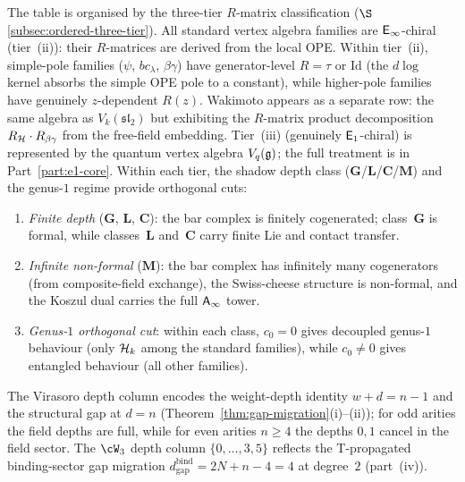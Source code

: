 \begin{computation}
The table is organised by the three-tier $R$-matrix
classification
($\S$\ref{subsec:ordered-three-tier}).
All standard vertex algebra families are $\mathsf{E}_{\infty}$-chiral
(tier~(ii)): their $R$-matrices are derived from the
local OPE\@. Within tier~(ii), simple-pole families
($\psi$, $bc_\lambda$, $\beta\gamma$) have
generator-level $R = \tau$ or $\mathrm{Id}$
(the $d\log$ kernel absorbs the simple OPE pole to
a constant), while higher-pole families have genuinely
$z$-dependent $R(z)$. Wakimoto appears as a separate
row: the same algebra as $V_k(\mathfrak{sl}_2)$ but
exhibiting the $R$-matrix product decomposition
$R_{\mathcal{H}} \cdot R_{\beta\gamma}$ from the free-field
embedding. Tier~(iii) (genuinely $\mathsf{E}_1$-chiral)
is represented by the quantum vertex algebra $V_q(\mathfrak{g})$;
the full treatment is in Part~\ref{part:e1-core}\@.
Within each tier, the shadow depth class
($\mathbf{G}$/$\mathbf{L}$/$\mathbf{C}$/$\mathbf{M}$)
and the genus-$1$ regime provide orthogonal cuts:

\begin{enumerate}[label=\textup{(\roman*)},nosep]
\item \emph{Finite depth} ($\mathbf{G}$, $\mathbf{L}$,
 $\mathbf{C}$): the bar complex is finitely cogenerated;
 class~$\mathbf{G}$ is formal, while classes~$\mathbf{L}$
 and~$\mathbf{C}$ carry finite Lie and contact transfer.
\item \emph{Infinite non-formal} ($\mathbf{M}$): the bar
 complex has infinitely many cogenerators
 (from composite-field exchange), the Swiss-cheese
 structure is non-formal, and the Koszul dual carries
 the full $\mathsf{A}_{\infty}$ tower.
\item \emph{Genus-$1$ orthogonal cut}: within each class,
 $c_0 = 0$ gives decoupled genus-$1$ behaviour (only
 $\mathcal{H}_k$ among the standard families), while $c_0 \ne 0$
 gives entangled behaviour (all other families).
\end{enumerate}
The Virasoro depth column encodes the weight-depth identity
$w+d=n-1$ and the structural gap at \(d=n\)
(Theorem~\ref{thm:gap-migration}(i)--(ii)); for odd arities the
field depths are full, while for even arities \(n\ge4\) the
depths \(0,1\) cancel in the field sector.  The \(\cW_3\) depth
column \(\{0,\ldots,3,5\}\) reflects the T-propagated binding-sector gap migration
\(d_{\mathrm{gap}}^{\mathrm{bind}}=2N+n-4=4\) at degree~$2$
(part~(iv)).
\end{computation}

